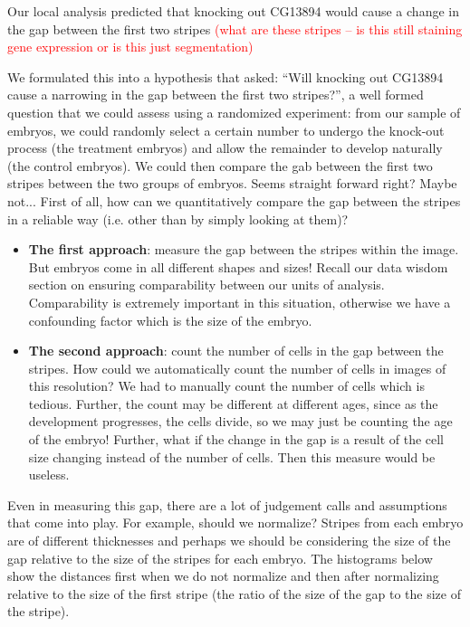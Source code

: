 Our local analysis predicted that knocking out CG13894 would cause a change in the gap between the first two stripes \textcolor{red}{(what are these stripes -- is this still staining gene expression or is this just segmentation)}


We formulated this into a hypothesis that asked: ``Will knocking out CG13894 cause a narrowing in the gap between the first two stripes?'', a well formed question that we could assess using a randomized experiment: from our sample of embryos, we could randomly select a certain number to undergo the knock-out process (the treatment embryos) and allow the remainder to develop naturally (the control embryos). We could then compare the gab between the first two stripes between the two groups of embryos. Seems straight forward right? Maybe not... First of all, how can we quantitatively compare the gap between the stripes in a reliable way (i.e. other than by simply looking at them)?




\begin{itemize}
\item {\bf The first approach}: measure the gap between the stripes within the image. But embryos come in all different shapes and sizes! Recall our data wisdom section on ensuring comparability between our units of analysis. Comparability is extremely important in this situation, otherwise we have a confounding factor which is the size of the embryo. 
\item {\bf The second approach}: count the number of cells in the gap between the stripes. How could we automatically count the number of cells in images of this resolution? We had to manually count the number of cells which is tedious. Further, the count may be different at different ages, since as the development progresses, the cells divide, so we may just be counting the age of the embryo! Further, what if the change in the gap is a result of the cell size changing instead of the number of cells. Then this measure would be useless.
\end{itemize}




Even in measuring this gap, there are a lot of judgement calls and assumptions that come into play. For example, should we normalize? Stripes from each embryo are of different thicknesses and perhaps we should be considering the size of the gap relative to the size of the stripes for each embryo. The histograms below show the distances first when we do not normalize and then after normalizing relative to the size of the first stripe (the ratio of the size of the gap to the size of the stripe).


